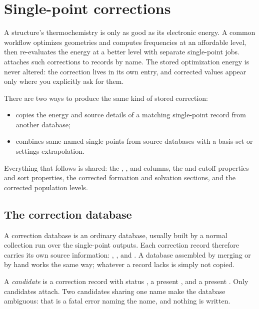 \section{Single-point corrections}\label{sec:corrections}

A structure's thermochemistry is only as good as its electronic energy. A
common workflow optimizes geometries and computes frequencies at an
affordable level, then re-evaluates the energy at a better level with separate
single-point jobs. \CJKQC{} attaches such corrections to records by name. The
stored optimization energy is never altered: the correction lives in its own
 entry, and corrected values appear only where you
explicitly ask for them.

There are two ways to produce the same kind of stored correction:

\begin{itemize}
  \item {} copies the energy and source details of a
        matching single-point record from another database;
  \item {} combines same-named single points from source
        databases with a basis-set or settings extrapolation.
\end{itemize}

Everything that follows is shared: the , , and
 columns, the  and  cutoff properties and
sort properties, the corrected formation and solvation sections, and the
corrected population levels.

\subsection{The correction database}\label{sec:correction-database}

A correction database is an ordinary \CJKQC{} database, usually built by a
normal collection run over the single-point outputs. Each correction record
therefore carries its own source information: ,
,
and . A database assembled by merging or by hand works the same
way; whatever a record lacks is simply not copied.

A \emph{candidate} is a correction record with status , a present
, and a present . Only candidates attach.
Two candidates sharing one name make the database ambiguous: that is a fatal
error naming the name, and nothing is written.


